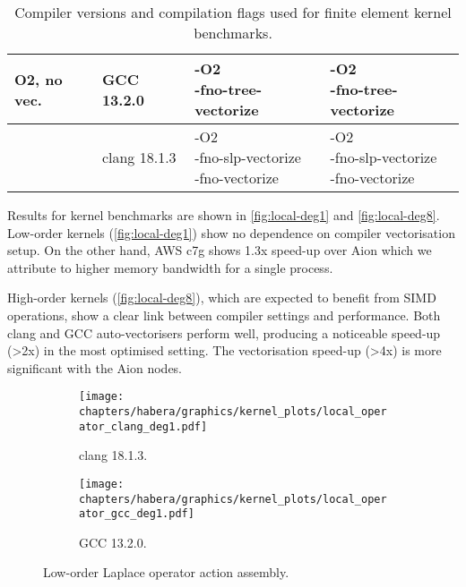 \begin{table}
\begin{tabular}{l|l|l|l}
        O2, no vec.                 & GCC 13.2.0   & \makecell[l]{-O2 \\ -fno-tree-vectorize}                                                        & \makecell[l]{-O2 \\ -fno-tree-vectorize} \\ \hline
                                    & clang 18.1.3 & \makecell[l]{-O2 \\ -fno-slp-vectorize \\ -fno-vectorize}                                       & \makecell[l]{-O2 \\ -fno-slp-vectorize \\ -fno-vectorize} \\ \hline
    \end{tabular}
    \vspace{5pt}
    \caption{Compiler versions and compilation flags used for finite element kernel benchmarks.}
    \label{tab:compilers-kernels}
\end{table}

Results for kernel benchmarks are shown in \autoref{fig:local-deg1}
and \autoref{fig:local-deg8}. Low-order kernels (\autoref{fig:local-deg1}) show no
dependence on compiler vectorisation setup. On the other hand, AWS c7g shows
1.3x speed-up over Aion which we attribute to higher memory bandwidth for a
single process.

High-order kernels (\autoref{fig:local-deg8}), which are expected to benefit from
SIMD operations, show a clear link between compiler settings and performance.
Both clang and GCC auto-vectorisers perform well, producing a noticeable
speed-up (\textgreater 2x) in the most optimised setting. The vectorisation
speed-up (\textgreater 4x) is more significant with the Aion nodes.

\begin{figure}
    \begin{subfigure}{.5\textwidth}
        \centering
        \texttt{[image: chapters/habera/graphics/kernel\_plots/local\_operator\_clang\_deg1.pdf]}
        \caption{clang 18.1.3.}
        \label{fig:local-clang-deg1}
    \end{subfigure}%
    \begin{subfigure}{.5\textwidth}
        \centering
        \texttt{[image: chapters/habera/graphics/kernel\_plots/local\_operator\_gcc\_deg1.pdf]}
        \caption{GCC 13.2.0.}
        \label{fig:local-gcc-deg1}
    \end{subfigure}
    \caption{Low-order Laplace operator action assembly.}
    \label{fig:local-deg1}
\end{figure}

